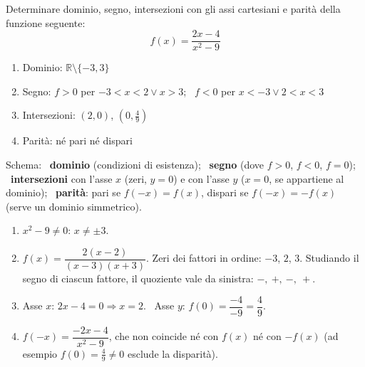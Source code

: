 \begin{question}[ID=1.3, subtitle={Studio di una funzione razionale fratta}, difficulty=media, tags={funzioni, studio di funzione}]
Determinare dominio, segno, intersezioni con gli assi cartesiani e parità della funzione seguente:
\begin{equation*}
    f(x)=\dfrac{2x-4}{x^2-9}
\end{equation*}
\begin{solution}
\begin{enumerate}
    \item Dominio: $\mathbb{R}\setminus\{-3,3\}$
    \item Segno: $f>0$ per $-3<x<2\vee x>3$; \ $f<0$ per $x<-3\vee2<x<3$
    \item Intersezioni: $(2,0)$, $\left(0,\tfrac49\right)$
    \item Parità: né pari né dispari
\end{enumerate}
\end{solution}
\begin{explanation}
Schema: \ \textbf{dominio} (condizioni di esistenza); \ \textbf{segno} (dove $f>0$, $f<0$, $f=0$); \ \textbf{intersezioni} con l'asse $x$ (zeri, $y=0$) e con l'asse $y$ ($x=0$, se appartiene al dominio); \ \textbf{parità}: pari se $f(-x)=f(x)$, dispari se $f(-x)=-f(x)$ (serve un dominio simmetrico).
\begin{enumerate}
    \item $x^2-9\neq0$: $x\neq\pm3$.
    \item $f(x)=\dfrac{2(x-2)}{(x-3)(x+3)}$. Zeri dei fattori in ordine: $-3$, $2$, $3$. Studiando il segno di ciascun fattore, il quoziente vale da sinistra: $-,\ +,\ -,\ +$.
    \item Asse $x$: $2x-4=0 \Rightarrow x=2$. \ Asse $y$: $f(0)=\dfrac{-4}{-9}=\dfrac49$.
    \item $f(-x)=\dfrac{-2x-4}{x^2-9}$, che non coincide né con $f(x)$ né con $-f(x)$ (ad esempio $f(0)=\tfrac49\neq0$ esclude la disparità).
\end{enumerate}
\end{explanation}
\end{question}


